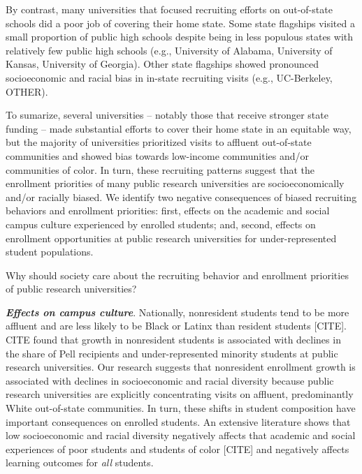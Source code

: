 \documentclass[twoside]{article}
\begin{document}
By contrast, many universities that focused recruiting efforts on out-of-state schools did a poor job of covering their home state. Some state flagships visited a small proportion of public high schools despite being in less populous states with relatively few public high schools (e.g., University of Alabama, University of Kansas, University of Georgia).  Other state flagships showed pronounced socioeconomic and racial bias in in-state recruiting visits (e.g., UC-Berkeley, OTHER).


To sumarize, several universities -- notably those that receive stronger state funding -- made substantial efforts to cover their home state in an equitable way, but the majority of universities prioritized visits to affluent out-of-state communities and showed bias towards low-income communities and/or communities of color.  In turn, these recruiting patterns suggest that the enrollment priorities of many public research universities are socioeconomically and/or racially biased.  We identify two negative consequences of biased recruiting behaviors and enrollment priorities: first, effects on the academic and social campus culture experienced by enrolled students; and, second, effects on enrollment opportunities at public research universities for under-represented student populations.

 Why should society care about the recruiting behavior and enrollment priorities of public research universities? 
 

\textbf{\textit{Effects on campus culture}}.  Nationally, nonresident students tend to be more affluent and are less likely to be Black or Latinx than resident students [CITE]. CITE found that growth in nonresident students is associated with declines in the share of Pell recipients and under-represented minority students at public research universities.  Our research suggests that nonresident enrollment growth is associated with declines in socioeconomic and racial diversity because public research universities are explicitly concentrating visits on affluent, predominantly White out-of-state communities.  In turn, these shifts in student composition have important consequences on enrolled students.  An extensive literature shows that low socioeconomic and racial diversity negatively affects that academic and social experiences of poor students and students of color [CITE] and negatively affects learning outcomes for \textit{all} students.  
\end{document}

